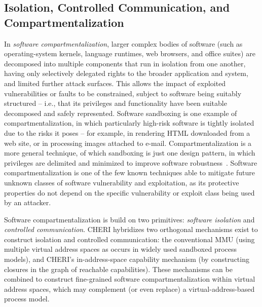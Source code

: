 \subsection{Isolation, Controlled Communication, and Compartmentalization}
\label{sec:model-isolation-controlled-communication-compartmentalization}

In \textit{software compartmentalization}, larger complex bodies of software
(such as operating-system kernels, language runtimes, web browsers, and office
suites) are decomposed into multiple components that run in isolation from one
another, having only selectively delegated rights to the broader application
and system, and limited further attack surfaces.
This allows the impact of exploited vulnerabilities or faults to be
constrained, subject to software being suitably structured -- i.e., that its
privileges and functionality have been suitable decomposed and safely
represented.
Software sandboxing is one example of compartmentalization, in which
particularly high-risk software is tightly isolated due to the risks it poses
-- for example, in rendering HTML downloaded from a web site, or in processing
images attached to e-mail.
Compartmentalization is a more general technique, of which sandboxing is just
one design pattern, in which privileges are delimited and minimized to improve
software
robustness~\cite{Karger87,provos:preventingprivesc,Watson10,gudka15:soaap}.
Software compartmentalization is one of the few known techniques able to
mitigate future unknown classes of software vulnerability and exploitation, as
its protective properties do not depend on the specific vulnerability or
exploit class being used by an attacker.

Software compartmentalization is build on two primitives: \textit{software
isolation} and \textit{controlled communication}.
CHERI hybridizes two orthogonal mechanisms exist to construct isolation and
controlled communication: the conventional MMU (using multiple virtual address
spaces as occurs in widely used sandboxed process models), and CHERI's
in-address-space capability mechanism (by constructing
closures  in the graph
of reachable capabilities).
These mechanisms can be combined to construct fine-grained software
compartmentalization within virtual address spaces, which may complement (or
even replace) a virtual-address-based process model.

